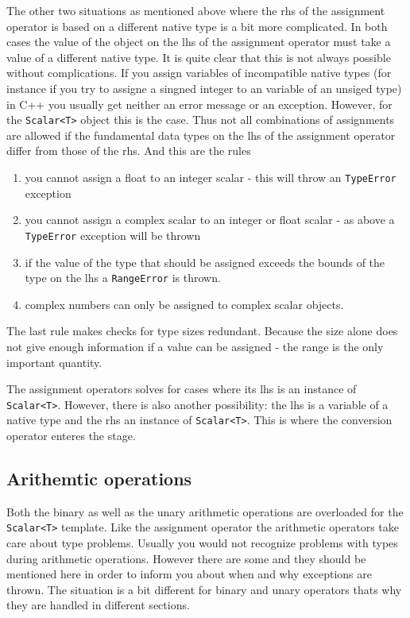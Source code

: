 The other two situations as mentioned above where the rhs of the assignment 
operator is based on a different native type is a bit more complicated. 
In both cases the value of the object on the lhs of the assignment operator 
must take a value of a different native type. It is quite clear that this is 
not always possible without complications. If you assign variables of 
incompatible native types (for instance if you try to assigne a singned integer
to an variable of an unsiged type) in C++ you usually get neither an error
message or an exception. However, for the {\tt Scalar<T>} object this is the 
case. Thus not all combinations of assignments are allowed if the fundamental 
data types on the lhs of the assignment operator differ from those of the 
rhs.
And this are the rules 
\begin{enumerate}
  \item you cannot assign a float to an integer scalar - this will throw an 
        {\tt TypeError} exception
  \item you cannot assign a complex scalar to an integer or float scalar - as 
        above a {\tt TypeError} exception will be thrown
  \item if the value of the type that should be assigned exceeds the bounds 
        of the type on the lhs a {\tt RangeError} is thrown.
  \item complex numbers can only be assigned to complex scalar objects.
\end{enumerate}
The last rule makes checks for type sizes redundant. Because the size alone 
does not give enough information if a value can be assigned - the range 
is the only important quantity.

The assignment operators solves for cases where its lhs is an instance of 
{\tt Scalar<T>}. However, there is also another possibility: the lhs is a 
variable of a native type and the rhs an instance of {\tt Scalar<T>}.
This is where the conversion operator enteres the stage. 


\subsection{Arithemtic operations}
Both the binary as well as the unary arithmetic operations are overloaded 
for the {\tt Scalar<T>} template. Like the assignment operator the arithmetic
operators take care about type problems. Usually you would not recognize
problems with types during arithmetic operations. However there are some 
and they should be mentioned here in order to inform you about when and why 
exceptions are thrown. The situation is a bit different for binary and unary 
operators thats why they are handled in different sections.

